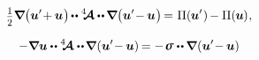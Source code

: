 \begin{equation*}
\smalldisplaystyleonehalf \boldnabla \bigl(
\bm{u}' \hspace{-0.4ex} + \hspace{-0.1ex} \bm{u}
\hspace{.1ex} \bigr) \hspace{-0.2ex}
\dotdotp \stiffnesstensor \hspace{-0.1ex} \dotdotp \hspace{-0.15ex} \boldnabla \bigl(
\bm{u}' \hspace{-0.4ex} - \hspace{-0.1ex} \bm{u}
\hspace{.1ex} \bigr) \hspace{-0.25ex}
= \hspace{.1ex} \potentialenergydensity (\hspace{-0.1ex}\bm{u}'\hspace{.1ex}) \hspace{-0.2ex}
- \potentialenergydensity (\hspace{-0.1ex}\bm{u}\hspace{-0.1ex})
\hspace{.1ex} ,
\end{equation*}

\noindent
{}

\begin{equation*}
- \boldnabla \bm{u}
\dotdotp \stiffnesstensor \dotdotp
\hspace{-0.25ex} \boldnabla \hspace{.1ex}
( \bm{u}' \hspace{-0.4ex} - \hspace{-0.1ex} \bm{u} ) \hspace{-0.2ex}
= - \hspace{.2ex} \linearstress \dotdotp
\hspace{-0.1ex} \boldnabla
\hspace{.1ex} ( \bm{u}' \hspace{-0.4ex} - \hspace{-0.1ex} \bm{u} )
\end{equation*}

\noindent
{}

